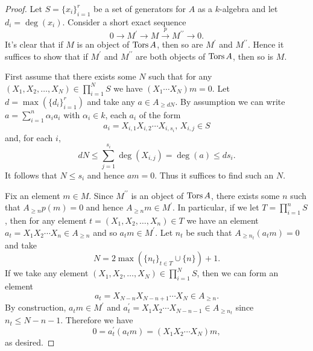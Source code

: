 \begin{proof}
  Let \(S = \{x_i\}_{i=1}^r\) be a set of generators for \(A\) as a \(k\)-algebra and let \(d_i = \deg(x_i)\).
  Consider a short exact sequence
  \[0 \to M^\prime \to M \overset{p}\to M^{\prime\prime} \to 0.\]
  It's clear that if \(M\) is an object of \(\operatorname{Tors}A\), then so are \(M^\prime\) and \(M^{\prime\prime}\).
  Hence it suffices to show that if \(M^\prime\) and \(M^{\prime\prime}\) are both objects of \(\operatorname{Tors}A\), then so is \(M\).
  
  First assume that there exists some \(N\) such that for any \((X_1, X_2, \ldots, X_N) \in \prod_{i = 1}^N S\) we have \((X_1 \cdots X_N)m = 0\).
  Let \(d = \max(\{d_i\}_{i = 1}^r)\) and take any \(a \in A_{\geq dN}\).
  By assumption we can write \(a = \sum_{i=1}^n \alpha_i a_i\) with \(\alpha_i \in k\), each \(a_i\) of the form
  \[a_i = X_{i,1} X_{i,2}\cdots X_{i, s_i},\, X_{i,j} \in S\]
  and, for each \(i\),
  \[dN \leq \sum_{j = 1}^{s_i} \deg(X_{i,j}) = \deg(a) \leq ds_i.\]
  It follows that \(N \leq s_i\) and hence \(am = 0\).
  Thus it suffices to find such an \(N\).

  Fix an element \(m \in M\).
  Since \(M^{\prime\prime}\) is an object of \(\operatorname{Tors}A\), there exists some \(n\) such that \(A_{\geq n} p(m) = 0\) and hence \(A_{\geq n}m \in M^\prime\).
  In particular, if we let \(T = \prod_{i = 1}^n S\), then for any element \(t = (X_1, X_2, \ldots, X_n) \in T\) we have an element \(a_t = X_1 X_2 \cdots X_n \in A_{\geq n}\) and so \(a_t m \in M^\prime\).
  Let \(n_t\) be such that \(A_{\geq n_t} (a_t m) = 0\) and take
  \[N = 2\max(\{n_t\}_{t \in T} \cup \{n\}) + 1.\]
  If we take any element \((X_1, X_2, \ldots, X_N) \in \prod_{i = 1}^N S\), then we can form an element
     \[a_t = X_{N - n} X_{N - n + 1} \cdots X_N \in A_{\geq n}.\]
  By construction, \(a_t m \in M^\prime\) and \(a_t^\prime = X_1 X_2 \cdots X_{N - n - 1} \in A_{\geq n_t}\) since \(n_t \leq N - n - 1\).
  Therefore we have
  \[0 = a_t^\prime (a_t m) = (X_1 X_2 \cdots X_N) m,\]
  as desired.
\end{proof}

